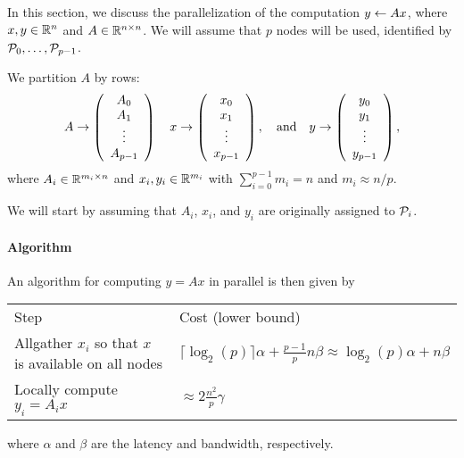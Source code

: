 


In this section, we discuss the parallelization of the
computation $ y \leftarrow A x $, where $ x, y \in \mathbb{R}^{n} $ and $ A \in \mathbb{R}^{n \times n} $.
We will assume that $ p $ nodes will be used, identified by $ {\cal P}_0, 
\ldots , {\cal P}_{p-1} $.

We partition $A$ by rows:
\[
A \rightarrow \left( \begin{array}{c} A_0 \\ A_1 \\ \vdots \\ A_{p-1} \end{array} \right) 
\quad
x \rightarrow \left( \begin{array}{c} x_0 \\ x_1 \\ \vdots \\ x_{p-1} \end{array} \right) ,
\quad
\mbox{and}
\quad
y \rightarrow \left( \begin{array}{c} y_0 \\ y_1 \\ \vdots \\ y_{p-1} \end{array} \right) ,
\]
where $ A_i \in \mathbb{R}^{m_i \times n} $ and $ x_i, y_i \in \mathbb{R}^{m_i} $ with
$ \sum_{i=0}^{p-1} m_i = n $ and $ m_i \approx n / p $.

We will start by assuming
that $ A_i $, $ x_i $, and $ y_i $ are originally assigned to $ {\cal P}_i $.

\paragraph*{Algorithm}

An algorithm for computing $ y = A x $ in parallel is then given by
\\[0.1in]
\begin{center}
\begin{tabular}{| p{3.5in} |  p{3.0in} |}\hline
Step & Cost (lower bound) \\ \whline
Allgather $ x_i $ so that $ x $ is available on all nodes & 
$ \lceil \log_2(p)\rceil \alpha + \frac{p-1}{p} n \beta \approx
\log_2(p) \alpha + n \beta $ \\
Locally compute $ y_i = A_i x $ &
$ \approx 2 \frac{n^2}{p} \gamma $ \\ \hline
\end{tabular}
\end{center}
where $\alpha$ and $\beta$ are the latency and bandwidth,
respectively.

